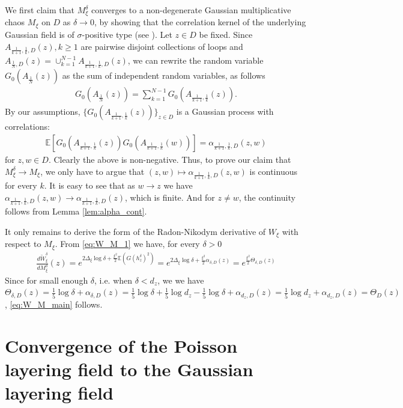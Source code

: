 \documentclass[a4paper, 11pt, reqno]{amsart}
\theoremstyle{definition} \newtheorem{defn}{Definition}[section]
\theoremstyle{remark} \newtheorem{rem}[defn]{Remark}
\theoremstyle{remark} \newtheorem*{rem*}{Remark}
\theoremstyle{plain} \newtheorem{thm}[defn]{Theorem}
\theoremstyle{plain} \newtheorem{lem}[defn]{Lemma}
\theoremstyle{plain} \newtheorem{prop}[defn]{Proposition}
\theoremstyle{plain} \newtheorem{cor}[defn]{Corollary}
\theoremstyle{remark} \newtheorem{exm}[defn]{\textbf{Example}}
\theoremstyle{remark} \newtheorem{exms}[defn]{\textbf{Examples}}
\theoremstyle{remark} \newtheorem*{bl}{}
\numberwithin{equation}{section} %
\newcommand{\E}{\mathbb{E}}
\begin{document}
		We first claim that $M^{\delta}_{\xi}$ converges to a non-degenerate Gaussian multiplicative chaos $M_{\xi}$ on $D$ as $\delta \to 0$, by showing that the correlation kernel of the underlying Gaussian field is of $\sigma$-positive type (see \cite[p. 321]{rv14}). Let $z \in D$ be fixed. Since $A_{\frac{1}{k+1}, \frac{1}{k}, D}(z), k \ge 1$ are pairwise disjoint collections of loops and $A_{\frac{1}{N}, D}(z) = \cup_{k=1}^{N-1} A_{\frac{1}{k+1}, \frac{1}{k}, D}(z)$, we can rewrite the random variable $G_0(A_{\frac{1}{N}}(z))$ as the sum of independent random variables, as follows
		\begin{align}
			G_0(A_{\frac{1}{N}}(z)) = \sum_{k=1}^{N-1} G_0 (A_{\frac{1}{k+1}, \frac{1}{k}}(z)).
		\end{align}
		By our assumptions, $\{G_0 (A_{\frac{1}{k+1}, \frac{1}{k}}(z))\}_{z \in D}$ is a Gaussian process with correlations:
		\begin{align}
			\E [ G_0 (A_{\frac{1}{k+1}, \frac{1}{k}}(z)) G_0 (A_{\frac{1}{k+1}, \frac{1}{k}}(w)) ] = \alpha_{\frac{1}{k+1}, \frac{1}{k}, D}(z,w)
		\end{align}
		for $z, w \in D$. Clearly the above is non-negative. Thus, to prove our claim that $M^{\delta}_{\xi} \to M_{\xi}$, we only have to argue that $(z, w) \mapsto \alpha_{\frac{1}{k+1}, \frac{1}{k}, D}(z,w)$ is continuous for every $k$. It is easy to see that as $w\to z$ we have $\alpha_{\frac{1}{k+1}, \frac{1}{k}, D}(z,w) \to \alpha_{\frac{1}{k+1}, \frac{1}{k}, D}(z)$, which is finite. And for $z \neq w$, the continuity follows from Lemma \ref{lem:alpha_cont}.
		
		It only remains to derive the form of the Radon-Nikodym derivative of $W_{\xi}$ with respect to $M_{\xi}$. From \eqref{eq:W_M_1} we have, for every $\delta>0$
		\begin{align}
			\frac{d \tilde{W}^{\delta}_{\xi}}{d M^{\delta}_{\xi}}(z) = e^{2\Delta_{\xi} \log \delta + \frac{\xi^2}{2} \E(G(h^{\delta}_z)^2) } = e^{2\Delta_{\xi}\log \delta  + \frac{\xi^2}{2} \alpha_{\delta, D}(z) } = e^{\frac{\xi^2}{2}\Theta_{\delta, D}(z)}
		\end{align}
		Since for small enough $\delta$, i.e. when $\delta < d_z$, we 
		we have $\Theta_{\delta, D}(z) =  \frac{1}{5} \log \delta +  \alpha_{\delta, D}(z) = \frac{1}{5} \log \delta+ \frac{1}{5} \log d_z -  \frac{1}{5} \log \delta +  \alpha_{d_z, D}(z) 
		=\frac{1}{5} \log d_z +  \alpha_{d_z, D}(z) = \Theta_D(z)$,  \eqref{eq:W_M_main} follows.        
	
	\section{Convergence of the Poisson layering field to the Gaussian layering field}\label{sec:PLF_to_GLF}
\end{document}
